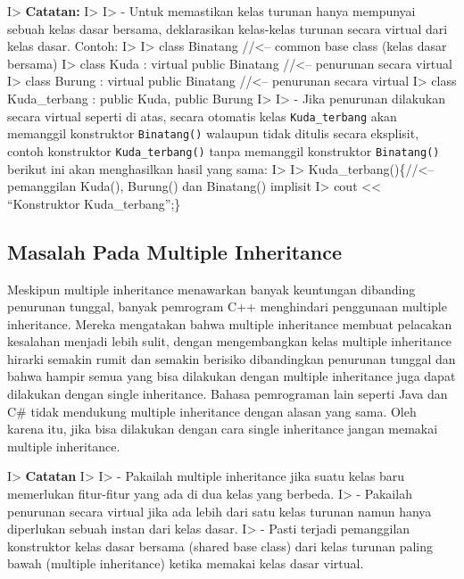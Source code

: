 I\textgreater{} \textbf{Catatan:} I\textgreater{} I\textgreater{} -
Untuk memastikan kelas turunan hanya mempunyai sebuah kelas dasar
bersama, deklarasikan kelas-kelas turunan secara virtual dari kelas
dasar. Contoh: I\textgreater{} I\textgreater{} class Binatang
//\textless{}-- common base class (kelas dasar bersama) I\textgreater{}
class Kuda : virtual public Binatang //\textless{}-- penurunan secara
virtual I\textgreater{} class Burung : virtual public Binatang
//\textless{}-- penurunan secara virtual I\textgreater{} class
Kuda\_terbang : public Kuda, public Burung I\textgreater{}
I\textgreater{} - Jika penurunan dilakukan secara virtual seperti di
atas, secara otomatis kelas \texttt{Kuda\_terbang} akan memanggil
konstruktor \texttt{Binatang()} walaupun tidak ditulis secara eksplisit,
contoh konstruktor \texttt{Kuda\_terbang()} tanpa memanggil konstruktor
\texttt{Binatang()} berikut ini akan menghasilkan hasil yang sama:
I\textgreater{} I\textgreater{} Kuda\_terbang()\{//\textless{}--
pemanggilan Kuda(), Burung() dan Binatang() implisit I\textgreater{}
cout \textless{}\textless{} ``Konstruktor Kuda\_terbang\n'';\}

\subsection{Masalah Pada Multiple
Inheritance}\label{masalah-pada-multiple-inheritance}

Meskipun multiple inheritance menawarkan banyak keuntungan dibanding
penurunan tunggal, banyak pemrogram C++ menghindari penggunaan multiple
inheritance. Mereka mengatakan bahwa multiple inheritance membuat
pelacakan kesalahan menjadi lebih sulit, dengan mengembangkan kelas
multiple inheritance hirarki semakin rumit dan semakin berisiko
dibandingkan penurunan tunggal dan bahwa hampir semua yang bisa
dilakukan dengan multiple inheritance juga dapat dilakukan dengan single
inheritance. Bahasa pemrograman lain seperti Java dan C\# tidak
mendukung multiple inheritance dengan alasan yang sama. Oleh karena itu,
jika bisa dilakukan dengan cara single inheritance jangan memakai
multiple inheritance.

I\textgreater{} \textbf{Catatan} I\textgreater{} I\textgreater{} -
Pakailah multiple inheritance jika suatu kelas baru memerlukan
fitur-fitur yang ada di dua kelas yang berbeda. I\textgreater{} -
Pakailah penurunan secara virtual jika ada lebih dari satu kelas turunan
namun hanya diperlukan sebuah instan dari kelas dasar. I\textgreater{} -
Pasti terjadi pemanggilan konstruktor kelas dasar bersama (shared base
class) dari kelas turunan paling bawah (multiple inheritance) ketika
memakai kelas dasar virtual.
